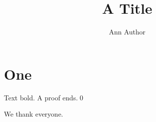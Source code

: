 \documentclass{asme2ej}
\title{A Title}
\author{Ann Author}
\begin{document}
\maketitle
\begin{nomenclature}
\end{nomenclature}
\section{One}
Text {\tensfb bold}. A proof ends.\qed
\begin{acknowledgment}
We thank everyone.
\end{acknowledgment}
\end{document}
